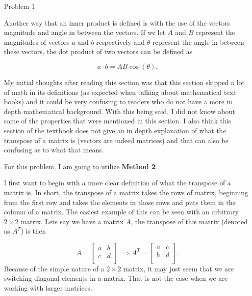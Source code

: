 \begin{problem}{Problem 1}
\begin{Highlight}
        Another way that an inner product is defined is with the use of the vectors magnitude and angle in between the vectors. If we let $A$ and $B$ represent the magnitudes of vectors $a$ and $b$ 
        respectively and $\theta$ represent the angle in between these vectors, the dot product of two vectors can be defined as

        \setcounter{equation}{0}
        \begin{equation}
            a \cdot b = AB\cos{(\theta)}.
        \end{equation}

        My initial thoughts after reading this section was that this section skipped a lot of math in its definitions (as expected when talking about mathematical text books) and it could be very 
        confusing to readers who do not have a more in depth mathematical background. With this being said, I did not know about some of the properties that were mentioned in this section. I also 
        think this section of the textbook does not give an in depth explanation of what the transpose of a matrix is (vectors are indeed matrices) and that can also be confusing as to what that means.
    \end{Highlight}

    \begin{Highlight}
        For this problem, I am going to utilize \textbf{Method 2}. \vspace*{1em}

        I first want to begin with a more clear definition of what the transpose of a matrix is. In short, the transpose of a matrix takes the rows of matrix, beginning from the first row and takes the
        elements in those rows and puts them in the column of a matrix. The easiest example of this can be seen with an arbitrary $2 \times 2$ matrix. Lets say we have a matrix $A$, the transpose of this
        matrix (denoted as $A^{T}$) is then

        \begin{equation}
            A = 
            \begin{bmatrix}
                a & b \\
                c & d \\
            \end{bmatrix}
            \implies
            A^{T} = 
            \begin{bmatrix}
                a & c \\
                b & d \\
            \end{bmatrix}.
        \end{equation}
        Because of the simple nature of a $2 \times 2$ matrix, it may just seem that we are switching diagonal elements in a matrix. That is not the case when we are working with larger matrices.


\end{Highlight}
\end{problem}
